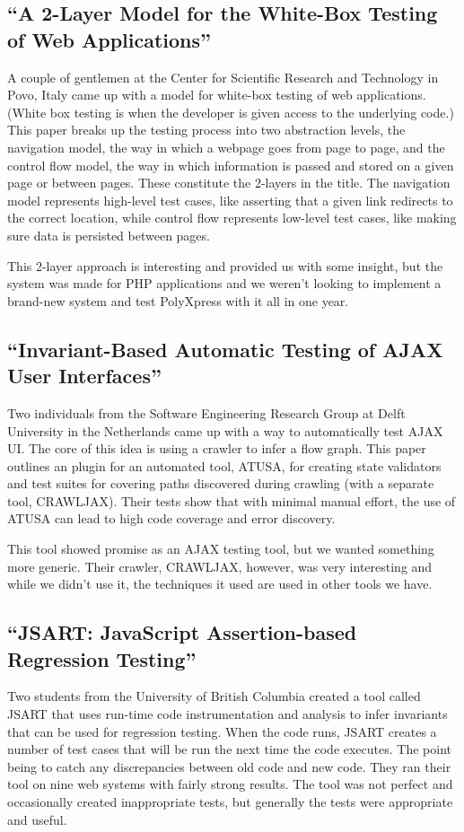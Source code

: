 \documentclass[12pt]{ucthesis}
\begin{document}
\subsection{``A 2-Layer Model for the White-Box Testing of Web Applications''}
A couple of gentlemen at the Center for Scientific Research and Technology in Povo, Italy came up with a model for white-box testing of web applications\cite{2LayerModel}. (White box testing is when the developer is given access to the underlying code.) This paper breaks up the testing process into two abstraction levels, the navigation model, the way in which a webpage goes from page to page, and the control flow model, the way in which information is passed and stored on a given page or between pages. These constitute the 2-layers in the title. The navigation model represents high-level test cases, like asserting that a given link redirects to the correct location, while control flow represents low-level test cases, like making sure data is persisted between pages. 

This 2-layer approach is interesting and provided us with some insight, but the system was made for PHP applications and we weren't looking to implement a brand-new system and test PolyXpress with it all in one year.

\subsection{``Invariant-Based Automatic Testing of AJAX User Interfaces''}
Two individuals from the Software Engineering Research Group at Delft University in the Netherlands came up with a way to automatically test AJAX UI\cite{InvariantBasedUseInterfaces}. The core of this idea is using a crawler to infer a flow graph. This paper outlines an plugin for an automated tool, ATUSA, for creating state validators and test suites for covering paths discovered during crawling (with a separate tool, CRAWLJAX). Their tests show that with minimal manual effort, the use of ATUSA can lead to high code coverage and error discovery. 

This tool showed promise as an AJAX testing tool, but we wanted something more generic. Their crawler, CRAWLJAX, however, was very interesting and while we didn't use it, the techniques it used are used in other tools we have.

\subsection{``JSART: JavaScript Assertion-based Regression Testing''}
Two students from the University of British Columbia created a tool called JSART that uses run-time code instrumentation and analysis to infer invariants that can be used for regression testing\cite{JSART}. When the code runs, JSART creates a number of test cases that will be run the next time the code executes. The point being to catch any discrepancies between old code and new code. They ran their tool on nine web systems with fairly strong results. The tool was not perfect and occasionally created inappropriate tests, but generally the tests were appropriate and useful.
\end{document}
